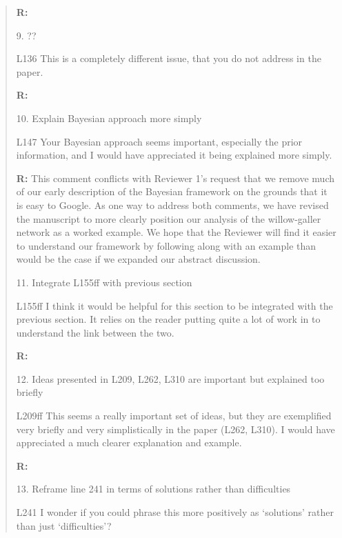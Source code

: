 \documentclass[12pt]{letter}
\newenvironment{refquote}{\bigskip \begin{it}}{\end{it}\smallskip}
\begin{document}
\begin{quotation}
	\textbf{R:}

	9. ??

	\begin{refquote}
	L136 This is a completely different issue, that you do not address in the paper.
	\end{refquote}

	\textbf{R:}

	10. Explain Bayesian approach more simply

	\begin{refquote}
	L147 Your Bayesian approach seems important, especially the prior information, and I would have appreciated it being explained more simply.
	\end{refquote}

	\textbf{R:} This comment conflicts with Reviewer 1's request that we remove much of our early description of the Bayesian framework on the grounds that it is easy to Google. As one way to address both comments, we have revised the manuscript to more clearly position our analysis of the willow-galler network as a worked example. We hope that the Reviewer will find it easier to understand our framework by following along with an example than would be the case if we expanded our abstract discussion.

	11. Integrate L155ff with previous section

	\begin{refquote}
	L155ff I think it would be helpful for this section to be integrated with the previous section. It relies on the reader putting quite a lot of work in to understand the link between the two.
	\end{refquote}

	\textbf{R:}

	12. Ideas presented in L209, L262, L310 are important but explained too briefly

	\begin{refquote}
	L209ff This seems a really important set of ideas, but they are exemplified very briefly and very simplistically in the paper (L262, L310). I would have appreciated a much clearer explanation and example.
	\end{refquote}

	\textbf{R:}

	13. Reframe line 241 in terms of solutions rather than difficulties

	\begin{refquote}
	L241 I wonder if you could phrase this more positively as ‘solutions’ rather than just ‘difficulties’?
	\end{refquote}


\end{quotation}
\end{document}
